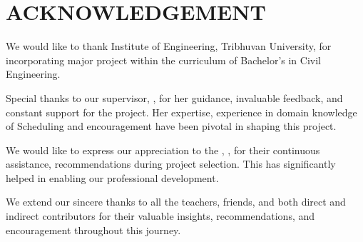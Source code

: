 \chapter*{ACKNOWLEDGEMENT}
{}

We would like to thank Institute of Engineering, Tribhuvan University, for
incorporating  major project within the curriculum of Bachelor’s in Civil Engineering.

Special thanks to our supervisor, \textbf{\cSupervisor}, for her guidance, invaluable feedback, and constant support for the project. Her expertise, experience in domain knowledge of Scheduling and encouragement have been pivotal in shaping this project.


We would like to express our appreciation to the {\cSupervisorDept}, {\cCampus}, for their continuous assistance,
recommendations during project selection. This has significantly helped in enabling our professional development.


We extend our sincere thanks to all the teachers, friends, and both direct and indirect contributors for their valuable insights, recommendations, and encouragement throughout this journey.

